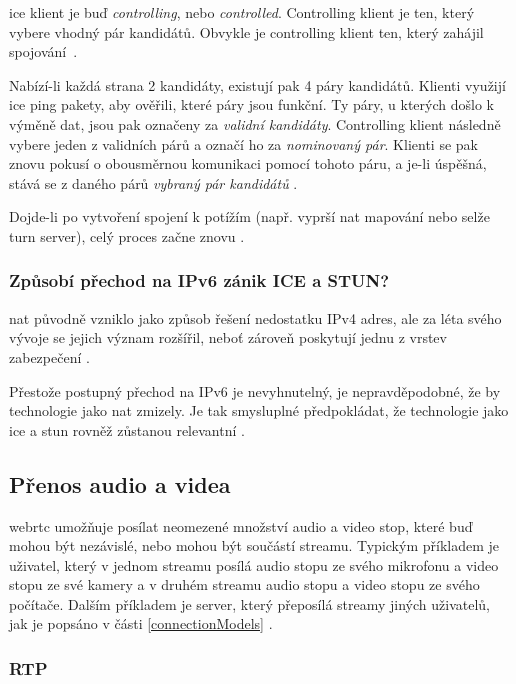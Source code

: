 \gls{ice} klient je buď \textit{controlling}, nebo \textit{controlled}.
Controlling klient je ten, který vybere vhodný pár kandidátů. Obvykle je
controlling klient ten, který zahájil spojování~\parencite{WebRTCForTheCurious}.

Nabízí-li každá strana 2 kandidáty, existují pak 4 páry kandidátů. Klienti
využijí \gls{ice} ping pakety, aby ověřili, které páry jsou funkční. Ty páry, u
kterých došlo k výměně dat, jsou pak označeny za \textit{validní kandidáty}.
Controlling klient následně vybere jeden z validních párů a označí ho za
\textit{nominovaný pár}. Klienti se pak znovu pokusí o obousměrnou komunikaci
pomocí tohoto páru, a je-li úspěšná, stává se z daného párů \textit{vybraný pár
    kandidátů} \parencite{WebRTCForTheCurious}.

Dojde-li po vytvoření spojení k potížím (např. vyprší \gls{nat} mapování nebo
selže \gls{turn} server), celý proces začne znovu
\parencite{WebRTCForTheCurious}.

\subsubsection{Způsobí přechod na IPv6 zánik ICE a STUN?}

\gls{nat} původně vzniklo jako způsob řešení nedostatku IPv4 adres, ale za léta
svého vývoje se jejich význam rozšířil, neboť zároveň poskytují jednu z vrstev
zabezpečení \parencite{Quora-WillIPv6KillSTUNAndICE}.

Přestože postupný přechod na IPv6 je nevyhnutelný, je nepravděpodobné, že by
technologie jako \gls{nat} zmizely. Je tak smysluplné předpokládat, že
technologie jako \gls{ice} a \gls{stun} rovněž zůstanou relevantní
\parencite{Quora-WillIPv6KillSTUNAndICE}.

\subsection{Přenos audio a videa}

\gls{webrtc} umožňuje posílat neomezené množství audio a video stop, které buď
mohou být nezávislé, nebo mohou být součástí streamu. Typickým příkladem je
uživatel, který v jednom streamu posílá audio stopu ze svého mikrofonu a video
stopu ze své kamery a v druhém streamu audio stopu a video stopu ze svého
počítače. Dalším příkladem je server, který přeposílá streamy jiných uživatelů,
jak je popsáno v části \ref{connectionModels} \parencite{WebRTCForTheCurious}.

\subsubsection{RTP}\label{rtp}


